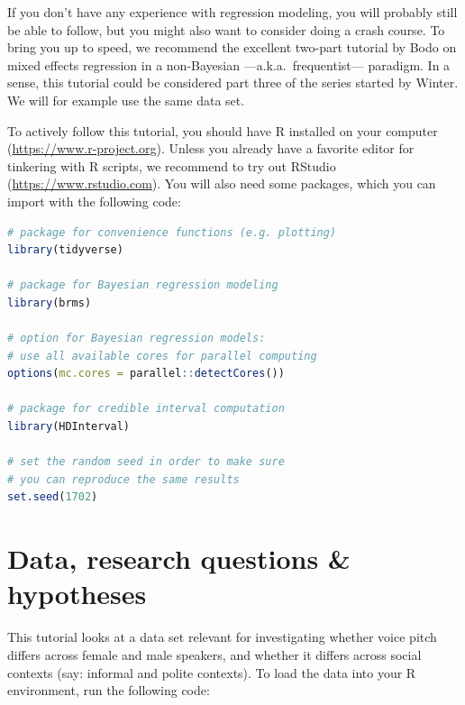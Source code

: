\documentclass[nobib]{tufte-handout}
\begin{document}
If you don’t have any experience with regression modeling, you will probably still be able to follow, but you might also want to consider doing a crash course. To bring you up to speed, we recommend the excellent two-part tutorial by Bodo \citet{Winter2013:Linear-models-a} on mixed effects regression in a non-Bayesian ---a.k.a.~frequentist--- paradigm. In a sense, this tutorial could be considered part three of the series started by Winter. We will for example use the same data set.

To actively follow this tutorial, you should have R installed on your computer (\url{https://www.r-project.org}).
Unless you already have a favorite editor for tinkering with R scripts, we recommend to try out RStudio (\url{https://www.rstudio.com}).
You will also need some packages,
which you can import with the following code:

\begin{minipage}[]{\textwidth}
\begin{lstlisting}[language=R]
# package for convenience functions (e.g. plotting)
library(tidyverse)

# package for Bayesian regression modeling
library(brms)

# option for Bayesian regression models: 
# use all available cores for parallel computing
options(mc.cores = parallel::detectCores())

# package for credible interval computation
library(HDInterval)

# set the random seed in order to make sure 
# you can reproduce the same results
set.seed(1702)
\end{lstlisting}
\end{minipage}

\vspace{-0.5cm}

\section{Data, research questions \& hypotheses}
\label{sec:data}

This tutorial looks at a data set relevant for investigating whether voice pitch differs across female and male speakers, and whether it differs across social contexts (say: informal and polite contexts).
To load the data into your R environment, run the following code:
%
%
\end{document}
